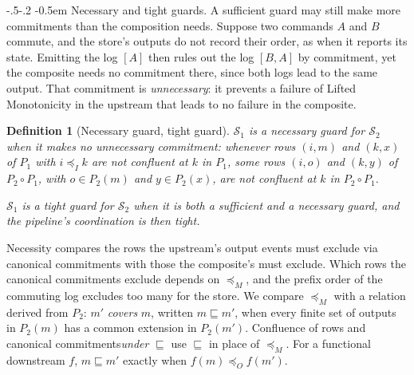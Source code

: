 \documentclass[sigconf]{cidr-2027}
\makeatletter
\newtheorem{definition}{Definition}
\theoremstyle{remark}
\renewcommand\paragraph{\@startsection{paragraph}{4}{\z@}%
  {-.5\baselineskip \@plus -2\p@ \@minus -.2\p@}%
  {-0.5em}%
  {\normalfont\bfseries}}
\newcommand{\InputOrd}{\preceq_I}
\newcommand{\OutputOrd}{\preceq_O}
\newcommand{\commitment}{commitment\xspace}
\newcommand{\commitments}{commitments\xspace}
\newcommand{\Spec}{\mathcal{S}}
\makeatother
\begin{document}
\paragraph{Necessary and tight guards.}
A sufficient guard may still make more \commitments than the composition
needs. Suppose two commands $A$ and $B$ commute,
and the store's outputs do not record their order, as when it reports its
state. Emitting the log $[A]$ then rules out the log $[B,A]$ by \commitment,
yet the composite needs no \commitment there, since both logs lead to the same
output. \textcolor{reviewed}{That \commitment is \emph{unnecessary}: it prevents a
failure of Lifted Monotonicity in the upstream that leads to no failure in the
composite.}

\begin{definition}[Necessary guard, tight guard]
\label{def:necessary-guard}
\label{def:tight-guard}
\textcolor{reviewed}{$\Spec_1$ is a \emph{necessary guard} for $\Spec_2$ when it makes no
unnecessary \commitment: whenever rows $(i,m)$ and $(k,x)$
of $P_1$ with $i\InputOrd k$ are not confluent at $k$ in $P_1$, some rows
$(i,o)$ and $(k,y)$ of $P_2\circ P_1$, with $o\in P_2(m)$ and $y\in P_2(x)$,
are not confluent at $k$ in $P_2\circ P_1$.}

\textcolor{reviewed}{$\Spec_1$ is a \emph{tight guard} for $\Spec_2$ when it is both a
sufficient and a necessary guard, and the pipeline's coordination is then
\emph{tight}.}
\end{definition}

\textcolor{reviewed}{Necessity compares the rows the upstream's output events must exclude via
canonical \commitments with those the composite's must exclude.} \textcolor{reviewed}{Which rows the
canonical \commitments exclude depends on $\preceq_M$, and the prefix order of
the commuting log excludes too many for the store.} \textcolor{reviewed}{We compare
$\preceq_M$ with a relation derived from $P_2$: $m'$ \emph{covers} $m$,
written $m\sqsubseteq m'$, when every finite set of outputs in $P_2(m)$ has a
common extension in $P_2(m')$.} \textcolor{reviewed}{Confluence of rows and canonical
\commitments \emph{under} $\sqsubseteq$ use $\sqsubseteq$ in place of
$\preceq_M$.} For a functional downstream $f$, $m\sqsubseteq m'$ exactly when
$f(m)\OutputOrd f(m')$.
\end{document}
